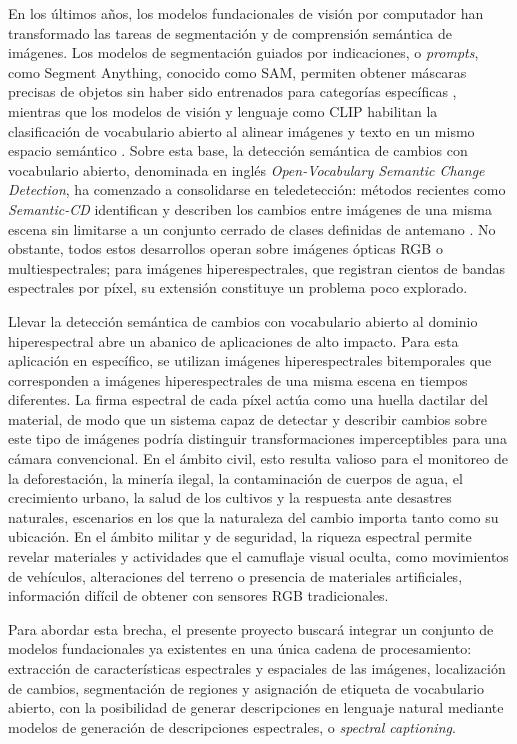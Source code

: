
En los últimos años, los modelos fundacionales de visión por computador han transformado las tareas de segmentación y de comprensión semántica de imágenes. Los modelos de segmentación guiados por indicaciones, o \textit{prompts}, como Segment Anything, conocido como SAM, permiten obtener máscaras precisas de objetos sin haber sido entrenados para categorías específicas \parencite{kirillov2023sam}, mientras que los modelos de visión y lenguaje como CLIP habilitan la clasificación de vocabulario abierto al alinear imágenes y texto en un mismo espacio semántico \parencite{radford2021clip}. Sobre esta base, la detección semántica de cambios con vocabulario abierto, denominada en inglés \textit{Open-Vocabulary Semantic Change Detection}, ha comenzado a consolidarse en teledetección: métodos recientes como \textit{Semantic-CD} identifican y describen los cambios entre imágenes de una misma escena sin limitarse a un conjunto cerrado de clases definidas de antemano \parencite{zhu2025semanticcd}. No obstante, todos estos desarrollos operan sobre imágenes ópticas RGB o multiespectrales; para imágenes hiperespectrales, que registran cientos de bandas espectrales por píxel, su extensión constituye un problema poco explorado.

Llevar la detección semántica de cambios con vocabulario abierto al dominio hiperespectral abre un abanico de aplicaciones de alto impacto. Para esta aplicación en específico, se utilizan imágenes hiperespectrales bitemporales que corresponden a imágenes hiperespectrales de una misma escena en tiempos diferentes. La firma espectral de cada píxel actúa como una huella dactilar del material, de modo que un sistema capaz de detectar y describir cambios sobre este tipo de imágenes podría distinguir transformaciones imperceptibles para una cámara convencional. En el ámbito civil, esto resulta valioso para el monitoreo de la deforestación, la minería ilegal, la contaminación de cuerpos de agua, el crecimiento urbano, la salud de los cultivos y la respuesta ante desastres naturales, escenarios en los que la naturaleza del cambio importa tanto como su ubicación. En el ámbito militar y de seguridad, la riqueza espectral permite revelar materiales y actividades que el camuflaje visual oculta, como movimientos de vehículos, alteraciones del terreno o presencia de materiales artificiales, información difícil de obtener con sensores RGB tradicionales.

Para abordar esta brecha, el presente proyecto buscará integrar un conjunto de modelos fundacionales ya existentes en una única cadena de procesamiento: extracción de características espectrales y espaciales de las imágenes, localización de cambios, segmentación de regiones y asignación de etiqueta de vocabulario abierto, con la posibilidad de generar descripciones en lenguaje natural mediante modelos de generación de descripciones espectrales, o \textit{spectral captioning}.

